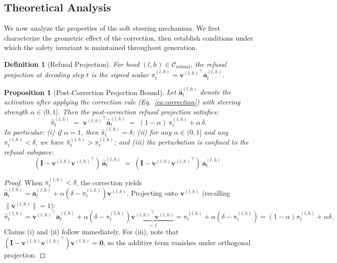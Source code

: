 \documentclass[11pt]{article}
\newtheorem{definition}{Definition}
\newtheorem{proposition}{Proposition}
\begin{document}
\subsection{Theoretical Analysis}
\label{subsec:theory}

We now analyze the properties of the soft steering mechanism. We first characterize the geometric effect of the correction, then establish conditions under which the safety invariant is maintained throughout generation.

\begin{definition}[Refusal Projection]
\label{def:refusal_proj}
For head $(l,h)\in\mathcal{C}_{\mathrm{refusal}}$, the \emph{refusal projection} at decoding step $t$ is the signed scalar $\pi_t^{(l,h)} = {\mathbf{v}^{(l,h)}}^\top\!\mathbf{a}_t^{(l,h)}$.
\end{definition}

\begin{proposition}[Post-Correction Projection Bound]
\label{prop:correction_bound}
Let $\hat{\mathbf{a}}_t^{(l,h)}$ denote the activation after applying the correction rule (Eq.~\ref{eq:correction}) with steering strength $\alpha\in(0,1]$. Then the post-correction refusal projection satisfies:
\begin{equation}
\label{eq:post_bound}
\hat{\pi}_t^{(l,h)} \;=\; {\mathbf{v}^{(l,h)}}^\top\!\hat{\mathbf{a}}_t^{(l,h)} \;=\; (1-\alpha)\,\pi_t^{(l,h)} + \alpha\,\delta.
\end{equation}
In particular: (i) if $\alpha=1$, then $\hat{\pi}_t^{(l,h)}=\delta$; (ii) for any $\alpha\in(0,1]$ and any $\pi_t^{(l,h)}<\delta$, we have $\hat{\pi}_t^{(l,h)}>\pi_t^{(l,h)}$; and (iii) the perturbation is confined to the refusal subspace:
\begin{equation}
(\mathbf{I} - \mathbf{v}^{(l,h)}{\mathbf{v}^{(l,h)}}^\top)\,\hat{\mathbf{a}}_t^{(l,h)} \;=\; (\mathbf{I} - \mathbf{v}^{(l,h)}{\mathbf{v}^{(l,h)}}^\top)\,\mathbf{a}_t^{(l,h)}.
\end{equation}
\end{proposition}

\begin{proof}
When $\pi_t^{(l,h)}<\delta$, the correction yields $\hat{\mathbf{a}}_t^{(l,h)} = \mathbf{a}_t^{(l,h)} + \alpha(\delta - \pi_t^{(l,h)})\mathbf{v}^{(l,h)}$. Projecting onto $\mathbf{v}^{(l,h)}$ (recalling $\|\mathbf{v}^{(l,h)}\|=1$):
\[
\hat{\pi}_t^{(l,h)} = {\mathbf{v}^{(l,h)}}^\top\!\mathbf{a}_t^{(l,h)} + \alpha(\delta - \pi_t^{(l,h)})\underbrace{{\mathbf{v}^{(l,h)}}^\top\!\mathbf{v}^{(l,h)}}_{=1} = \pi_t^{(l,h)} + \alpha(\delta - \pi_t^{(l,h)}) = (1-\alpha)\pi_t^{(l,h)} + \alpha\delta.
\]
Claims (i) and (ii) follow immediately. For (iii), note that $(\mathbf{I}-\mathbf{v}^{(l,h)}{\mathbf{v}^{(l,h)}}^\top)\mathbf{v}^{(l,h)}=\mathbf{0}$, so the additive term vanishes under orthogonal projection.
\end{proof}
\end{document}
